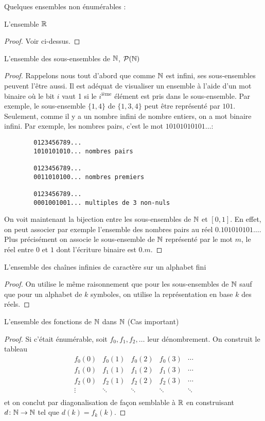 Quelques ensembles non énumérables :
\begin{myexem}
 L'ensemble $\mathbb{R}$
 \begin{proof}
   Voir ci-dessus.
 \end{proof}
\end{myexem}

\begin{myexem}
 L'ensemble des sous-ensembles de $\mathbb{N}$, $\mathcal{P}(\mathbb{N})$
 \begin{proof}
   Rappelons nous tout d'abord que comme $\mathbb{N}$ est infini, ses sous-ensembles peuvent l'être aussi.
   Il est adéquat de visualiser un ensemble à l'aide d'un mot binaire
   où le bit $i$ vaut 1 si le $i^{\mathrm{ième}}$ élément est pris dans le sous-ensemble.
   Par exemple, le sous-ensemble $\{1,4\}$ de $\{1,3,4\}$ peut être représenté par $101$.
   Seulement, comme il y a un nombre infini de nombre entiers, on a mot binaire infini.
   Par exemple, les nombres pairs, c'est le mot $10101010101\ldots$:
   \begin{verbatim}
		0123456789...
		1010101010... nombres pairs
		
		0123456789...
		0011010100... nombres premiers
		
		0123456789...
		0001001001... multiples de 3 non-nuls
    \end{verbatim}
   On voit maintenant la bijection entre les sous-ensembles de $\mathbb{N}$ et $[0,1]$.
   En effet, on peut associer par exemple l'ensemble des nombres pairs au réel $0.101010101\ldots$.
   Plus précisément on associe le sous-ensemble de $\mathbb{N}$ représenté par le mot $m$, le réel entre $0$ et $1$ dont l'écriture binaire est $0.m$.
 \end{proof}
\end{myexem}

\begin{myexem}
 L'ensemble des chaînes infinies de caractère sur un alphabet fini
 \begin{proof}
   On utilise le même raisonnement que pour les sous-ensembles de $\mathbb{N}$ sauf que pour un alphabet de $k$ symboles,
   on utilise la représentation en base $k$ des réels.
 \end{proof}
\end{myexem}

\begin{myexem}
  \label{exem:fNN}
 L'ensemble des fonctions de $\mathbb{N}$ dans $\mathbb{N}$ (Cas important)
 \begin{proof}
   Si c'était énumérable, soit $f_0, f_1, f_2, \ldots$ leur dénombrement.
   On construit le tableau
   \[
     \begin{array}{ccccc}
       f_0(0) & f_0(1) & f_0(2) & f_0(3) & \cdots\\
       f_1(0) & f_1(1) & f_1(2) & f_1(3) & \cdots\\
       f_2(0) & f_2(1) & f_2(2) & f_2(3) & \cdots\\
       \vdots & \ddots & \ddots & \ddots & \ddots\\
     \end{array}
   \]
   et on conclut par diagonalisation de façon semblable à $\mathbb{R}$
   en construisant $d\colon \mathbb{N} \to \mathbb{N}$ tel que $d(k) = f_k(k)$.
 \end{proof}
\end{myexem}

